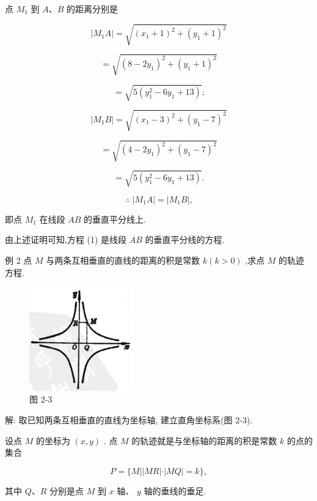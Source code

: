 \documentclass[lang=cn,newtx,10pt,scheme=chinese]{elegantbook}
\begin{document}
点 \({M}_{1}\) 到 \(A\text{、}B\) 的距离分别是

\[
  \left| {{M}_{1}A}\right| = \sqrt{{\left( {x}_{1} + 1\right) }^{2} + {\left( {y}_{1} + 1\right) }^{2}}
\]

\[
  = \sqrt{{\left( 8 - 2{y}_{1}\right) }^{2} + {\left( {y}_{1} + 1\right) }^{2}}
\]

\[
  = \sqrt{5\left( {{y}_{1}^{2} - 6{y}_{1} + {13}}\right) }\text{;}
\]

\[
  \left| {{M}_{1}B}\right| = \sqrt{{\left( {x}_{1} - 3\right) }^{2} + {\left( {y}_{1} - 7\right) }^{2}}
\]

\[
  = \sqrt{{\left( 4 - 2{y}_{1}\right) }^{2} + {\left( {y}_{1} - 7\right) }^{2}}
\]

\[
  = \sqrt{5\left( {{y}_{1}^{2} - 6{y}_{1} + {13}}\right) }\text{.}
\]

\[
  \therefore \;\left| {{M}_{1}A}\right| = \left| {{M}_{1}B}\right| \text{,}
\]

即点 \({M}_{1}\) 在线段 \({AB}\) 的垂直平分线上.

由上述证明可知,方程 (1) 是线段 \({AB}\) 的垂直平分线的方程.

例 2 点 \(M\) 与两条互相垂直的直线的距离的积是常数 \(k\left( {k > 0}\right)\) ,求点 \(M\) 的轨迹方程.

\begin{figure}[h]
  \centering
  \includegraphics[max width=0.4\textwidth]{images/01912cc2-ffb6-728e-9ae7-b113ff05c64b_68_272250.jpg}
  \caption{图 2-3}
\end{figure}



解: 取已知两条互相垂直的直线为坐标轴, 建立直角坐标系(图 2-3).

设点 \(M\) 的坐标为 \(\left( {x,y}\right)\) . 点 \(M\) 的轨迹就是与坐标轴的距离的积是常数 \(k\) 的点的集合

\[
  P = \{ M\left| \right| {MR}\left| \cdot \right| {MQ} \mid = k\} ,
\]

其中 \(Q\text{、}R\) 分别是点 \(M\) 到 \(x\) 轴、 \(y\) 轴的垂线的垂足.
\end{document}
